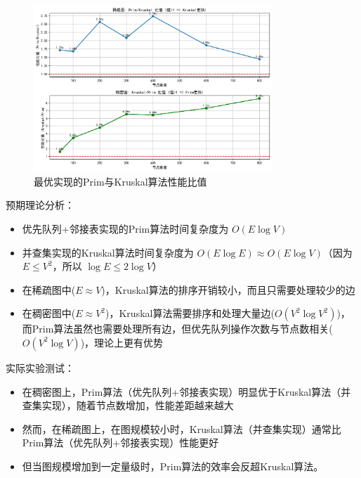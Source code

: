 \documentclass[a4paper,12pt]{ctexart}
\begin{document}
\begin{figure}[htbp]
    \centering
    \includegraphics[width=0.8\textwidth]{img/img_cpp2/theory_vs_actual_cpp.png}
    \caption{最优实现的Prim与Kruskal算法性能比值}
    \label{fig:optimal_dense}
\end{figure}

预期理论分析：
\begin{itemize}
    \item 优先队列+邻接表实现的Prim算法时间复杂度为 $O(E \log V)$
    \item 并查集实现的Kruskal算法时间复杂度为 $O(E \log E) \approx O(E \log V)$（因为 $E \leq V^2$，所以 $\log E \leq 2\log V$）
    \item 在稀疏图中($E \approx V$)，Kruskal算法的排序开销较小，而且只需要处理较少的边
    \item 在稠密图中($E \approx V^2$)，Kruskal算法需要排序和处理大量边($O(V^2 \log V^2)$)，而Prim算法虽然也需要处理所有边，但优先队列操作次数与节点数相关($O(V^2 \log V)$)，理论上更有优势
\end{itemize}

实际实验测试：
\begin{itemize}
    \item 在稠密图上，Prim算法（优先队列+邻接表实现）明显优于Kruskal算法（并查集实现），随着节点数增加，性能差距越来越大
    \item 然而，在稀疏图上，在图规模较小时，Kruskal算法（并查集实现）通常比Prim算法（优先队列+邻接表实现）性能更好
    \item 但当图规模增加到一定量级时，Prim算法的效率会反超Kruskal算法。
\end{itemize}
\end{document}
